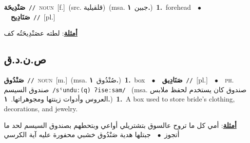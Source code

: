 \documentclass[10pt,a4paper,twoside]{article} %
\begin{document}
\begin{multicols}{2}
{\setlength\topsep{0pt}\textbf{\foreignlanguage{arabic}{صَنْدِيحَة}}\ {\color{gray}\texttt{//}\color{black}}\ \textsc{noun}\ [f.]\ (src. \color{gray}\foreignlanguage{arabic}{قلقيلية}\color{black})\ \color{gray}(msa. \foreignlanguage{arabic}{جبين}~\foreignlanguage{arabic}{\textbf{١.}})\color{black}\ \textbf{1.}~forehead\ \ $\bullet$\ \ \setlength\topsep{0pt}\textbf{\foreignlanguage{arabic}{صَنَادِيح}}\ {\color{gray}\texttt{//}\color{black}}\ [pl.]\  \begin{flushright}\color{gray}\foreignlanguage{arabic}{\textbf{\underline{\foreignlanguage{arabic}{أمثلة}}}: لطته عصَنْدِيحَتُه كف}\end{flushright}\color{black}} \vspace{2mm}

\vspace{-3mm}
\subsection*{\color{blue}\foreignlanguage{arabic}{ص.ن.د.ق}\color{blue}{}} 

{\setlength\topsep{0pt}\textbf{\foreignlanguage{arabic}{صَنْدُوق}}\ {\color{gray}\texttt{//}\color{black}}\ \textsc{noun}\ [m.]\ \color{gray}(msa. \foreignlanguage{arabic}{صُنْدُوق}~\foreignlanguage{arabic}{\textbf{١.}})\color{black}\ \textbf{1.}~box\ \ $\bullet$\ \ \setlength\topsep{0pt}\textbf{\foreignlanguage{arabic}{صَنَادِيق}}\ {\color{gray}\texttt{//}\color{black}}\ [pl.]\ \ $\bullet$\ \ \textsc{ph.} \color{gray} \foreignlanguage{arabic}{صندوق السيسم}\color{black}\ {\color{gray}\texttt{/{\sffamily sˤunduː(q) ʔiseːsam}/}\color{black}}\ \color{gray} (msa. \foreignlanguage{arabic}{صندوق كان يستخدم لحفظ ملابس العروس وأدوات زينتها ومجوهراتها.}~\foreignlanguage{arabic}{\textbf{١.}})\color{black}\ \textbf{1.}~A box used to store bride's clothing, decorations, and jewelry.\  \begin{flushright}\color{gray}\foreignlanguage{arabic}{\textbf{\underline{\foreignlanguage{arabic}{أمثلة}}}: أمي كل ما تروح عالسوق بتشتريلي أواعي وبتحطهم بصندوق السيسم لحد ما أتجوز\ $\bullet$\ \  جبتلها هدية صَنْدُوق خشبي محفورة عليه آية الكرسي}\end{flushright}\color{black}} \vspace{2mm}


\end{multicols}
\end{document}
